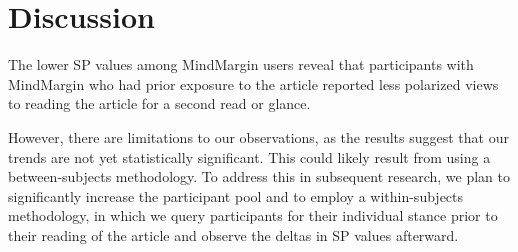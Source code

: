 \section{Discussion}



The lower SP values among MindMargin users reveal that participants with MindMargin who had prior exposure to the article reported less polarized views to reading the article for a second read or glance. 

However, there are limitations to our observations, as the results suggest that our trends are not yet statistically significant. This could likely result from using a between-subjects methodology. To address this in subsequent research, we plan to significantly increase the participant pool and to employ a within-subjects methodology, in which we query participants for their individual stance prior to their reading of the article and observe the deltas in SP values afterward. 

